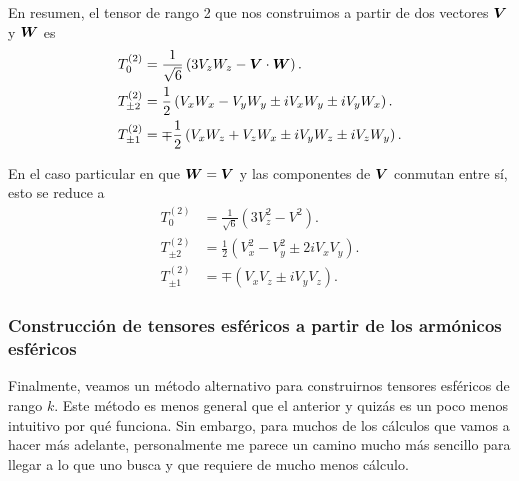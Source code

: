 \documentclass[10pt, a4paper]{article}
\numberwithin{equation}{subsection}
\begin{document}
En resumen, el tensor de rango 2 que nos construimos a partir de dos vectores
$\vb*{V}$ y $\vb*{W}$ es
\begin{align}
  T^{(2)}_{0} &= \frac{1}{\sqrt{6}}\left(3V_z W_z -
    \vb*{V}\cdot\vb*{W}\right). \\
  T^{(2)}_{\pm2} &= \frac{1}{2}\left(V_xW_x - V_yW_y \pm iV_xW_y \pm
    iV_yW_x\right). \\
  T^{(2)}_{\pm1} &= \mp\frac{1}{2}\left(V_xW_z + V_zW_x \pm iV_yW_z \pm
    iV_zW_y\right).
\end{align}

En el caso particular en que $\vb*{W} = \vb*{V}$  y las componentes de
$\vb*{V}$ conmutan entre sí, esto se reduce a
\begin{align} \label{eq:rescomp2same}
  T^{(2)}_0 &= \frac{1}{\sqrt{6}}\left(3V_z^2 - V^2\right). \\
  T^{(2)}_{\pm2} &= \frac{1}{2}\left(V_x^2 - V_y^2 \pm2iV_xV_y\right). \\
  T^{(2)}_{\pm1} &= \mp\left(V_xV_z \pm iV_yV_z \right).
\end{align}

\bigbreak


\bigbreak

\subsubsection{Construcción de tensores esféricos a partir de los armónicos
  esféricos}
\label{sec:constrtensarmon}

Finalmente, veamos un método alternativo para construirnos tensores esféricos de
rango $k$. Este método es menos general que el anterior y quizás es un poco
menos intuitivo por qué funciona. Sin embargo, para muchos de los cálculos que
vamos a hacer más adelante, personalmente me parece un camino mucho más
sencillo para llegar a lo que uno busca y que requiere de mucho menos cálculo.
\end{document}
